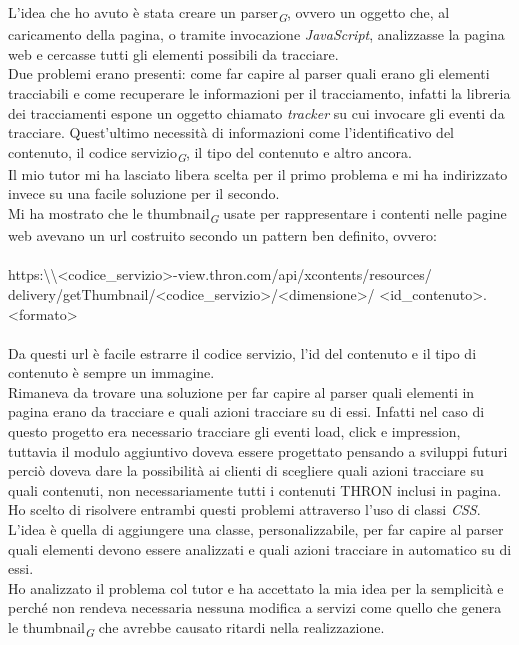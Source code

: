 \documentclass[a4paper, 12pt, twoside, openright]{book}
\newcommand{\gloss}[1]{#1\textsubscript{\textit{\tiny{G}}}}
\begin{document}
L'idea che ho avuto è stata creare un \gloss{parser}, ovvero un oggetto che, al caricamento della pagina, o tramite invocazione \textit{JavaScript}, analizzasse la pagina web e cercasse tutti gli elementi possibili da tracciare.\\
Due problemi erano presenti: come far capire al parser quali erano gli elementi tracciabili e come recuperare le informazioni per il tracciamento, infatti la libreria dei tracciamenti espone un oggetto chiamato \textit{tracker} su cui invocare gli eventi da tracciare. Quest'ultimo necessità di informazioni come l'identificativo del contenuto, il \gloss{codice servizio}, il tipo del contenuto e altro ancora.\\
Il mio tutor mi ha lasciato libera scelta per il primo problema e mi ha indirizzato invece su una facile soluzione per il secondo.\\
Mi ha mostrato che le \gloss{thumbnail} usate per rappresentare i contenti nelle pagine web avevano un url costruito secondo un pattern ben definito, ovvero:\\ \\
{\fontsize{10}{12}\selectfont https:\textbackslash\textbackslash<codice\_servizio>-view.thron.com/api/xcontents/resources/
delivery/getThumbnail/<codice\_servizio>/<dimensione>/
<id\_contenuto>.<formato>} %
\\ \\
Da questi url è facile estrarre il codice servizio, l'id del contenuto e il tipo di contenuto è sempre un immagine.\\
Rimaneva da trovare una soluzione per far capire al parser quali elementi in pagina erano da tracciare e quali azioni tracciare su di essi. Infatti nel caso di questo progetto era necessario tracciare gli eventi load, click e impression, tuttavia il modulo aggiuntivo doveva essere progettato pensando a sviluppi futuri perciò doveva dare la possibilità ai clienti di scegliere quali azioni tracciare su quali contenuti, non necessariamente tutti i contenuti THRON inclusi in pagina.\\
Ho scelto di risolvere entrambi questi problemi attraverso l'uso di classi \textit{CSS}. L'idea è quella di aggiungere una classe, personalizzabile, per far capire al parser quali elementi devono essere analizzati e quali azioni tracciare in automatico su di essi.\\
Ho analizzato il problema col tutor e ha accettato la mia idea per la semplicità e perché non rendeva necessaria nessuna modifica a servizi come quello che genera le \gloss{thumbnail} che avrebbe causato ritardi nella realizzazione.\\
\end{document}
